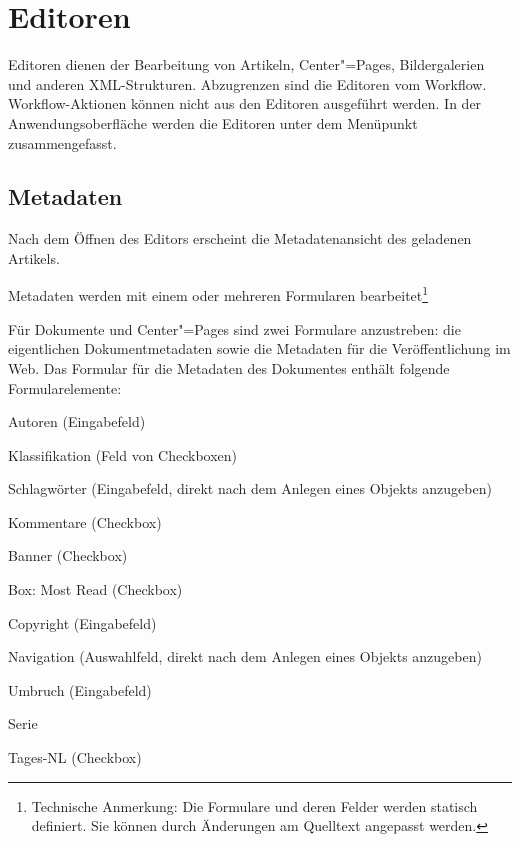 %

\chapter{Editoren}

Editoren dienen der Bearbeitung von Artikeln, Center"=Pages, Bildergalerien und
anderen XML-Strukturen. Abzugrenzen sind die Editoren vom Workflow.
Workflow-Aktionen können nicht aus den Editoren
ausgeführt werden. In der Anwendungsoberfläche werden die Editoren 
unter dem Menüpunkt  zusammengefasst.


\section{Metadaten} \label{sec-metadaten}

Nach dem Öffnen des Editors erscheint die Metadatenansicht des 
geladenen Artikels.

Metadaten werden mit einem oder mehreren Formularen bearbeitet\footnote{
Technische Anmerkung: Die Formulare und deren Felder werden statisch
definiert. Sie können durch Änderungen am Quelltext angepasst werden.}

Für Dokumente und Center"=Pages sind zwei Formulare anzustreben: die
eigentlichen Dokumentmetadaten sowie die Metadaten für die Veröffentlichung im
Web. Das Formular für die Metadaten des Dokumentes enthält folgende
Formularelemente:

\begin{compactitem}
  \item Autoren (Eingabefeld)
  \item Klassifikation (Feld von Checkboxen)
  \item Schlagwörter (Eingabefeld, direkt nach dem Anlegen eines Objekts
    anzugeben)
  \item Kommentare (Checkbox)
  \item Banner (Checkbox)
  \item Box: Most Read (Checkbox)
  \item Copyright (Eingabefeld)
  \item Navigation (Auswahlfeld, direkt nach dem Anlegen eines Objekts
    anzugeben)
  \item Umbruch (Eingabefeld)
  \item Serie
  \item Tages-NL (Checkbox)
\end{compactitem}

